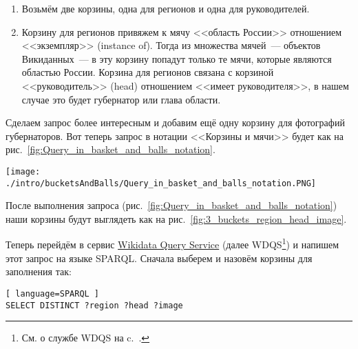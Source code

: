 \begin{enumerate}
    \item Возьмём две корзины, одна для регионов и одна для руководителей.
    \item Корзину для регионов привяжем к мячу <<область России>> отношением <<экземпляр>> (instance of). Тогда из множества мячей~--- объектов Викиданных~--- в эту корзину попадут только те мячи, которые являются областью России. Корзина для регионов связана с корзиной <<руководитель>> (head) отношением <<имеет руководителя>>, в нашем случае это будет губернатор или глава области.
\end{enumerate}

Сделаем запрос более интересным и добавим ещё одну корзину для фотографий губернаторов. Вот теперь запрос в нотации <<Корзины и мячи>> будет как на рис.~\ref{fig:Query_in_basket_and_balls_notation}.

\begin{figure*}[h!]
    \texttt{[image: ./intro/bucketsAndBalls/Query\_in\_basket\_and\_balls\_notation.PNG]}
    \caption{Запрос в нотации <<Корзины и мячи>> для заполнения корзин <<регион>> мячами <<область России>>, корзины <<руководитель>>~--- губернаторами или главами области, корзины <<изображение>>~--- их фотографиями.}
	\label{fig:Query_in_basket_and_balls_notation}
\end{figure*}

\newpage
После выполнения запроса (рис.~\ref{fig:Query_in_basket_and_balls_notation}) наши корзины будут выглядеть как на рис.~\ref{fig:3_buckets_region_head_image}.

\begin{marginfigure}
	{
		\setlength{\fboxsep}{0pt}%
		\setlength{\fboxrule}{1pt}%
	}
    \caption{Корзины после выполнении запроса на рис.~\ref{fig:Query_in_basket_and_balls_notation}. \textit{?region}~--- это области России, \textit{?head}~--- это руководители, \textit{?image}~--- это фотографии руководства.}
	\label{fig:3_buckets_region_head_image}
\end{marginfigure}

Теперь перейдём в сервис \href{https://query.wikidata.org/}{Wikidata Query Service} 
(далее WDQS\footnote[][15pt]{См. о службе WDQS на c.~\pageref{sect:WDQS}.})  и напишем этот запрос на языке SPARQL. Сначала выберем и назовём корзины для заполнения так:

\begin{lstlisting}[ language=SPARQL ]
SELECT DISTINCT ?region ?head ?image
\end{lstlisting}

